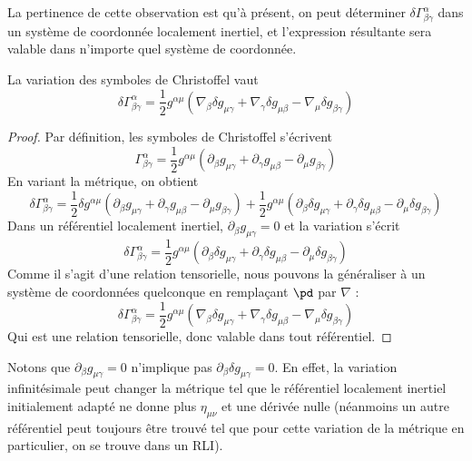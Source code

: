 La pertinence de cette observation est qu'à présent, on peut déterminer $\delta \Gamma^{\alpha}_{\beta \gamma}$ dans un système de coordonnée localement inertiel, et l'expression résultante sera valable dans n'importe quel système de coordonnée. 
\begin{theoremframe}
    \begin{propri}
        La variation des symboles de Christoffel vaut
        \begin{equation}
        \delta \Gamma^{\alpha}_{\beta \gamma} = \frac{1}{2}g^{\alpha \mu}(\nabla_{\beta} \delta g_{ \mu \gamma} + \nabla_{\gamma} \delta g_{\mu\beta} - \nabla_{\mu} \delta g_{\beta \gamma})
        \end{equation}
    \end{propri}    
\end{theoremframe}
\begin{proof}
    Par définition, les symboles de Christoffel s'écrivent
    \begin{equation}
        \Gamma^{\alpha}_{\beta \gamma} = \frac{1}{2}g^{\alpha \mu}(\partial_{\beta} g_{ \mu \gamma} + \partial_{\gamma}g_{\mu\beta} - \partial_{\mu}g_{\beta \gamma})
    \end{equation}
    En variant la métrique, on obtient
    \begin{equation}
        \delta \Gamma^{\alpha}_{\beta \gamma} = \frac{1}{2}\delta g^{\alpha \mu}(\partial_{\beta} g_{ \mu \gamma} + \partial_{\gamma}g_{\mu\beta} - \partial_{\mu}g_{\beta \gamma}) + \frac{1}{2}g^{\alpha \mu}(\partial_{\beta} \delta g_{ \mu \gamma} + \partial_{\gamma} \delta g_{\mu\beta} - \partial_{\mu} \delta g_{\beta \gamma})
    \end{equation}
    Dans un référentiel localement inertiel, $\partial_{\beta} g_{ \mu \gamma} = 0$ et la variation s'écrit
    \begin{equation}
        \delta \Gamma^{\alpha}_{\beta \gamma} = \frac{1}{2}g^{\alpha \mu}(\partial_{\beta} \delta g_{ \mu \gamma} + \partial_{\gamma} \delta g_{\mu\beta} - \partial_{\mu} \delta g_{\beta \gamma})
    \end{equation}
    Comme il s'agit d'une relation tensorielle, nous pouvons la généraliser à un système de coordonnées quelconque en remplaçant $\pd$ par $\nabla$ :
    \begin{equation}
        \delta \Gamma^{\alpha}_{\beta \gamma} = \frac{1}{2}g^{\alpha \mu}(\nabla_{\beta} \delta g_{ \mu \gamma} + \nabla_{\gamma} \delta g_{\mu\beta} - \nabla_{\mu} \delta g_{\beta \gamma})
    \end{equation}
    Qui est une relation tensorielle, donc valable dans tout référentiel.
\end{proof}
\begin{rmk}
    Notons que $\partial_{\beta} g_{ \mu \gamma} = 0$ n'implique pas $\partial_{\beta} \delta g_{ \mu \gamma} = 0$. En effet, la variation infinitésimale peut changer la métrique tel que le référentiel localement inertiel initialement adapté ne donne plus $\eta_{\mu\nu}$ et une dérivée nulle (néanmoins un autre référentiel peut toujours être trouvé tel que pour cette variation de la métrique en particulier, on se trouve dans un RLI).
\end{rmk}
